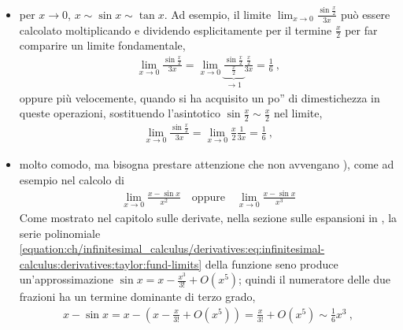 \documentclass[letterpaper,10pt,italian]{jupyterBook}
\begin{document}
\begin{itemize}
\item {} 
\sphinxAtStartPar
per \(x \rightarrow 0\), \(x \sim \sin x \sim \tan x\). Ad esempio, il limite \(\lim_{x\rightarrow 0} \frac{\sin \frac{x}{2}}{3 x}\) può essere calcolato moltiplicando e dividendo esplicitamente per il termine \(\frac{x}{2}\) per far comparire un limite fondamentale,
\begin{equation*}
\begin{split}\lim_{x \rightarrow 0} \frac{\sin \frac{x}{2}}{3x} = \lim_{x \rightarrow 0} \underbrace{\frac{\sin \frac{x}{2}}{\frac{x}{2}}}_{\rightarrow 1} \frac{\frac{x}{2}}{3x} = \frac{1}{6} \ ,\end{split}
\end{equation*}
\sphinxAtStartPar
oppure più velocemente, quando si ha acquisito un po” di dimestichezza in queste operazioni, sostituendo l’asintotico \(\sin \frac{x}{2} \sim \frac{x}{2}\) nel limite,
\begin{equation*}
\begin{split}\lim_{x \rightarrow 0} \frac{\sin \frac{x}{2}}{3x} = \lim_{x \rightarrow 0} \frac{x}{2} \frac{1}{3x} = \frac{1}{6} \ ,\end{split}
\end{equation*}
\item {} 
\sphinxAtStartPar
molto comodo, ma bisogna prestare attenzione che non avvengano ), come ad esempio nel calcolo di
\begin{equation*}
\begin{split}\lim_{x \rightarrow 0} \frac{x - \sin x}{x^2} \quad \text{oppure} \quad \lim_{x \rightarrow 0} \frac{x - \sin x}{x^3} \end{split}
\end{equation*}
\sphinxAtStartPar
Come mostrato nel capitolo sulle derivate, nella sezione sulle espansioni in {\hyperref[\detokenize{ch/infinitesimal_calculus/derivatives:infinitesimal-calculus-derivatives-taylor}]{}}, la serie polinomiale \eqref{equation:ch/infinitesimal_calculus/derivatives:eq:infinitesimal-calculus:derivatives:taylor:fund-limits} della funzione seno produce un’approssimazione \(\sin x = x - \frac{x^3}{3!} + O(x^5)\); quindi il numeratore delle due frazioni ha un termine dominante di terzo grado,
\begin{equation*}
\begin{split}x - \sin x = x - \left( x - \frac{x}{3!} + O(x^5) \right) = \frac{x}{3!} + O(x^5) \sim \frac{1}{6} x^3 \ ,\end{split}

\end{equation*}
\end{itemize}
\end{document}
